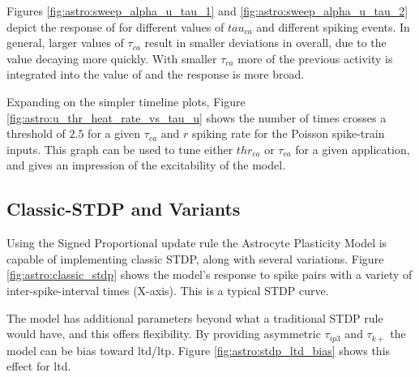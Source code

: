 

Figures \ref{fig:astro:sweep_alpha_u_tau_1} and
\ref{fig:astro:sweep_alpha_u_tau_2} depict the response of \ca for
different values of $tau_{ca}$ and different spiking events. In general,
larger values of $\tau_{ca}$ result in smaller deviations in \ca overall, due
to the value decaying more quickly. With smaller $\tau_{ca}$ more of the
previous activity is integrated into the value of \ca and the response is
more broad.

Expanding on the simpler timeline plots, Figure
\ref{fig:astro:u_thr_heat_rate_vs_tau_u} shows the number of times \ca crosses a
threshold of $2.5$ for a given $\tau_{ca}$ and $r$ spiking rate for the Poisson
spike-train inputs. This graph can be used to tune either $thr_{ca}$ or $\tau_{ca}$
for a given application, and gives an impression of the excitability of the
model.


\subsection{Classic-STDP and Variants} \label{sec:ordered_prop:stdp}

Using the Signed Proportional update rule the Astrocyte Plasticity Model is
capable of implementing classic STDP, along with several variations. Figure
\ref{fig:astro:classic_stdp} shows the model's response to spike pairs with
a variety of inter-spike-interval times (X-axis). This is a typical STDP
curve.


The model has additional parameters beyond what a traditional STDP rule
would have, and this offers flexibility. By providing asymmetric
$\tau_{ip3}$ and $\tau_{k+}$ the model can be bias toward \Gls{ltd}/\Gls{ltp}. Figure
\ref{fig:astro:stdp_ltd_bias} shows this effect for \Gls{ltd}.


